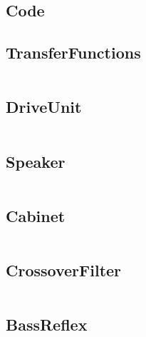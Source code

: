 \begin{appendices}

\chapter{Code}
\label{app:code}

\section{TransferFunctions}
\inputminted[linenos, breaklines, bgcolor=lightgray]{matlab}{../Matlab/TransferFunctions.m}

\section{DriveUnit}
\inputminted[linenos, breaklines, bgcolor=lightgray]{matlab}{../Matlab/DriveUnit.m}

\section{Speaker}
\inputminted[linenos, breaklines, bgcolor=lightgray]{matlab}{../Matlab/Speaker.m}

\section{Cabinet}
\inputminted[linenos, breaklines, bgcolor=lightgray]{matlab}{../Matlab/Cabinet.m}

\section{CrossoverFilter}
\inputminted[linenos, breaklines, bgcolor=lightgray]{matlab}{../Matlab/CrossoverFilter.m}

\section{BassReflex}
\inputminted[linenos, breaklines, bgcolor=lightgray]{matlab}{../Matlab/BassReflex.m}

\end{appendices}